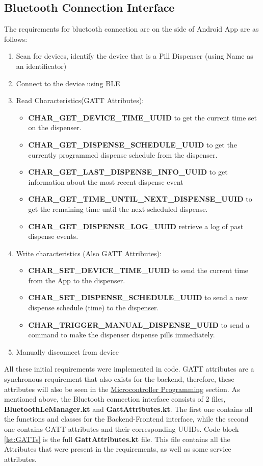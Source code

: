 \subsection{Bluetooth Connection Interface}
The requirements for bluetooth connection are on the side of Android App are as follows:
\begin{enumerate}
	\item Scan for devices, identify the device that is a Pill Dispenser (using Name as an identificator)
	\item Connect to the device using \ac{BLE}
	\item Read Characteristics(\ac{GATT} Attributes): 
	\begin{itemize}
		\item \textbf{CHAR\_GET\_DEVICE\_TIME\_UUID} to get the current time set on the dispenser.
		\item \textbf{CHAR\_GET\_DISPENSE\_SCHEDULE\_UUID} to get the currently programmed dispense schedule from the dispenser.
		\item \textbf{CHAR\_GET\_LAST\_DISPENSE\_INFO\_UUID} to get information about the most recent dispense event
		\item \textbf{CHAR\_GET\_TIME\_UNTIL\_NEXT\_DISPENSE\_UUID} to get the remaining time until the next scheduled dispense.
		\item \textbf{CHAR\_GET\_DISPENSE\_LOG\_UUID} retrieve a log of past dispense events.
	\end{itemize}
	\item Write characteristics (Also \ac{GATT} Attributes):
	\begin{itemize}
		\item \textbf{CHAR\_SET\_DEVICE\_TIME\_UUID} to send the current time from the App to the dispenser.
		\item \textbf{CHAR\_SET\_DISPENSE\_SCHEDULE\_UUID} to send a new dispense schedule (time) to the dispenser.
		\item \textbf{CHAR\_TRIGGER\_MANUAL\_DISPENSE\_UUID} to send a command to make the dispenser dispense pills immediately.
	\end{itemize}
	\item Manually disconnect from device
\end{enumerate}
All these initial requirements were implemented in code. \ac{GATT} attributes are a synchronous requirement that also exists for the backend, therefore, these attributes will also be seen in the \hyperref[sec:Backenddev]{Microcontroller Programming} section. As mentioned above, the Bluetooth connection interface consists of 2 files, \textbf{BluetoothLeManager.kt} and \textbf{GattAttributes.kt}. The first one contains all the functions and classes for the Backend-Frontend interface, while the second one contains \ac{GATT} attributes and their corresponding \ac{UUID}s. Code block \ref{lst:GATTs} is the full \textbf{GattAttributes.kt} file. This file contains all the Attributes that were present in the requirements, as well as some service attributes.

